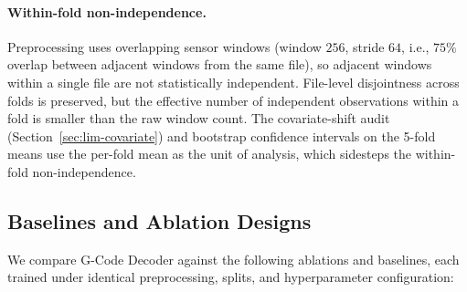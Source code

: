 \documentclass[sensors,article,submit,moreauthors,pdftex]{Definitions/mdpi}
\newcommand{\modelname}{G-Code Decoder}
\begin{document}
\paragraph{Within-fold non-independence.} Preprocessing uses overlapping sensor windows (window $256$, stride $64$, i.e., $75\%$ overlap between adjacent windows from the same file), so adjacent windows within a single file are not statistically independent. File-level disjointness across folds is preserved, but the effective number of independent observations within a fold is smaller than the raw window count. The covariate-shift audit (Section~\ref{sec:lim-covariate}) and bootstrap confidence intervals on the 5-fold means use the per-fold mean as the unit of analysis, which sidesteps the within-fold non-independence.

\subsection{Baselines and Ablation Designs}
\label{sec:ablations-design}

We compare \modelname{} against the following ablations and baselines, each trained under identical preprocessing, splits, and hyperparameter configuration:
\end{document}
